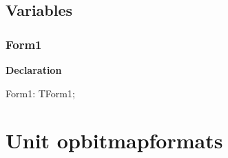 \documentclass{report}
\newif\ifpdf
\begin{document}
\section{Variables}
\ifpdf
\subsection*{\large{\textbf{Form1}}\normalsize\hspace{1ex}\hrulefill}
\else
\subsection*{Form1}
\fi
\label{mnupdate-Form1}
\begin{list}{}{
\setlength{\itemindent}{0cm}
\setlength{\listparindent}{0cm}
\setlength{\leftmargin}{\evensidemargin}
\addtolength{\leftmargin}{\tmplength}
\settowidth{\labelsep}{X}
\addtolength{\leftmargin}{\labelsep}
\setlength{\labelwidth}{\tmplength}
}
\item[\textbf{Declaration}\hfill]
\ifpdf
\begin{flushleft}
\fi
\begin{ttfamily}
Form1: TForm1;\end{ttfamily}

\ifpdf
\end{flushleft}
\fi

\end{list}
\chapter{Unit opbitmapformats}
\label{opbitmapformats}
\end{document}
